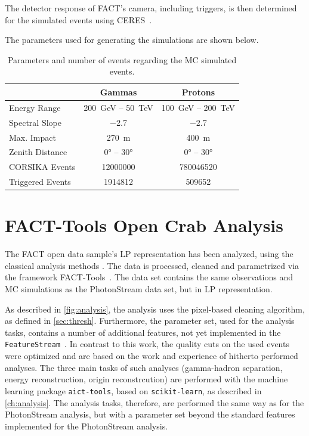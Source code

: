 The detector response of FACT's camera, including
triggers, is then determined for the simulated events using CERES~\cite{ceres}.

The parameters used for generating the simulations are shown below.

\begin{table}
  \centering%
  \begin{tabular}{l
                  c
                  c}
      \toprule
      {}    & Gammas  & Protons      \\
      \midrule
      Energy Range & \SI{200}{\GeV} – \SI{50}{\TeV} & \SI{100}{\GeV} – \SI{200}{\TeV} \\
      Spectral Slope & \num{-2.7} & \num{-2.7} \\
      Max. Impact & \SI{270}{\meter} & \SI{400}{\meter} \\
      Zenith Distance & \ang{0} – \ang{30} & \ang{0} – \ang{30} \\
      CORSIKA Events & \num{12000000} & \num{780046520}\\
      Triggered Events & \num{1914812} & \num{509652}\\
      \bottomrule
  \end{tabular}
  \caption{Parameters and number of events regarding the MC simulated events.}
  \label{tab:mcs}
\end{table}

\section{FACT-Tools Open Crab Analysis}\label{sec:facttools}
%
The FACT open data sample's LP representation has been analyzed, using the
classical analysis methods \cite{openana}. The data is processed, cleaned and
parametrized via the framework FACT-Tools~\cite{facttools}. The data set
contains the same observations and MC simulations as the PhotonStream data set,
but in LP representation.

As described in \autoref{fig:analysis}, the analysis uses the pixel-based
cleaning algorithm, as defined in \autoref{sec:thresh}. Furthermore, the
parameter set, used for the analysis tasks, contains a number of additional
features, not yet implemented in the
\texttt{FeatureStream}~\cite{FeatureStream}. In contrast to this work, the
quality cuts on the used events were optimized and are based on the work and
experience of hitherto performed analyses. The three main tasks of such
analyses (gamma-hadron separation, energy reconstruction, origin
reconstrcution) are performed with the machine learning package \texttt{aict-tools}, based on \texttt{scikit-learn}, as described in \autoref{ch:analysis}.
The analysis tasks, therefore, are performed the same way as for the
PhotonStream analysis, but with a parameter set beyond the standard features implemented for the PhotonStream analysis.

